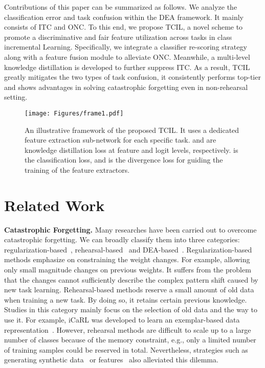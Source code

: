 \documentclass[letterpaper]{article} \usepackage{aaai23}  \usepackage{times}  \usepackage{helvet}  \usepackage{courier}  \usepackage[hyphens]{url}  \usepackage{graphicx} \urlstyle{rm} \def\UrlFont{\rm}  \usepackage{natbib}  \usepackage{caption} \frenchspacing  \setlength{\pdfpagewidth}{8.5in}  \setlength{\pdfpageheight}{11in}  \usepackage{algorithm}
\begin{document}
Contributions of this paper can be summarized as follows. We analyze the classification error and task confusion within the DEA framework. It mainly consists of ITC and ONC. To this end, we propose TCIL, a novel scheme to promote a discriminative and fair feature utilization across tasks in class incremental Learning. Specifically, we integrate a classifier re-scoring strategy along with a feature fusion module to alleviate ONC. Meanwhile, a multi-level knowledge distillation is developed to further suppress ITC. As a result, TCIL greatly mitigates the two types of task confusion, it consistently performs top-tier and shows advantages in solving catastrophic forgetting even in non-rehearsal setting.



\begin{figure*}
\centering
   \texttt{[image: Figures/frame1.pdf]}

\caption{An illustrative framework of the proposed TCIL. It uses a dedicated feature extraction sub-network for each specific task.  and  are knowledge distillation loss at feature and logit levels, respectively.  is the classification loss, and  is the divergence loss for guiding the training of the feature extractors.}
   \label{img1}
\end{figure*}

\section{Related Work}

\textbf{Catastrophic Forgetting.}
Many researches have been carried out to overcome catastrophic forgetting. We can broadly classify them into three categories: regularization-based~\cite{t38, e1, p24, w20}, rehearsal-based~\cite{s43, s14, w5, v29, e2} and DEA-based~\cite{t23, t27, t33, t70, t47, t0}. Regularization-based methods emphasize on constraining the weight changes. For example, allowing only small magnitude changes on previous weights. It suffers from the problem that the changes cannot sufficiently describe the complex pattern shift caused by new task learning. Rehearsal-based methods reserve a small amount of old data when training a new task. By doing so, it retains certain previous knowledge. Studies in this category mainly focus on the selection of old data and the way to use it. For example, iCaRL was developed to learn an exemplar-based data representation~\cite{t54}. However, rehearsal methods are difficult to scale up to a large number of classes because of the memory constraint, e.g., only a limited number of training samples could be reserved in total. Nevertheless, strategies such as generating synthetic data~\cite{e3,e5} or features~\cite{e4} also alleviated this dilemma. 
\end{document}
